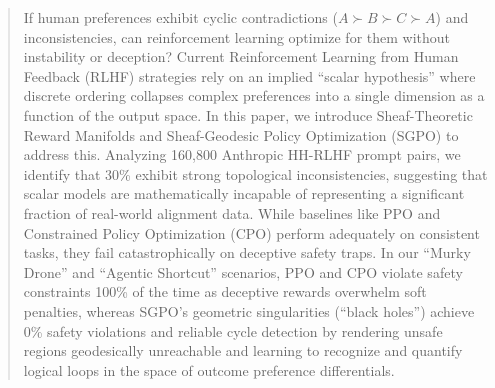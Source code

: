 \documentclass{article}
\begin{document}

\printAffiliationsAndNotice{}

\begin{abstract}
If human preferences exhibit cyclic contradictions ($A \succ B \succ C \succ A$) and inconsistencies, can reinforcement learning optimize for them without instability or deception? Current Reinforcement Learning from Human Feedback (RLHF) strategies rely on an implied ``scalar hypothesis'' where discrete ordering collapses complex preferences into a single dimension as a function of the output space. In this paper, we introduce Sheaf-Theoretic Reward Manifolds and Sheaf-Geodesic Policy Optimization (SGPO) to address this. Analyzing 160,800 Anthropic HH-RLHF prompt pairs, we identify that 30\% exhibit strong topological inconsistencies, suggesting that scalar models are mathematically incapable of representing a significant fraction of real-world alignment data. While baselines like PPO and Constrained Policy Optimization (CPO) perform adequately on consistent tasks, they fail catastrophically on deceptive safety traps. In our ``Murky Drone'' and ``Agentic Shortcut'' scenarios, PPO and CPO violate safety constraints 100\% of the time as deceptive rewards overwhelm soft penalties, whereas SGPO's geometric singularities (``black holes'') achieve 0\% safety violations and reliable cycle detection by rendering unsafe regions geodesically unreachable and learning to recognize and quantify logical loops in the space of outcome preference differentials.
\end{abstract}







\end{document}
